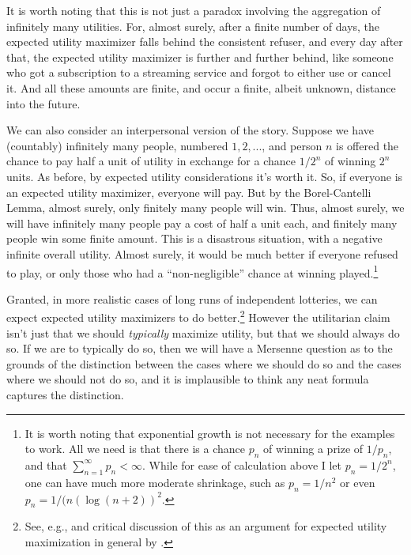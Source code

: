 It is worth noting that this is not just a paradox involving the aggregation of infinitely many utilities.
For, almost surely, after a finite number of days, the expected utility maximizer
falls behind the consistent refuser, and every day after that, the expected utility maximizer is further and further behind,
like someone who got a subscription to a streaming service and forgot to either use or cancel it. And all these amounts are 
finite, and occur a finite, albeit unknown, distance into the future.

We can also consider an interpersonal version of the story. Suppose we have (countably) infinitely many people, numbered $1,2,...$, and person $n$ 
is offered the chance to pay half a unit of utility in exchange for a chance $1/2^n$ of winning $2^n$ units. As before, by expected utility
considerations it's worth it. So, if everyone is an expected utility maximizer, everyone will pay. But by the Borel-Cantelli Lemma, 
almost surely, only finitely many people will win. Thus, almost surely, we will have infinitely many people
pay a cost of half a unit each, and finitely many people win some finite amount. This is a disastrous situation, with a negative infinite
overall utility. Almost surely, it would be much better if everyone refused to play, or only those who had a ``non-negligible'' chance 
at winning played.\footnote{It is worth noting that exponential growth is not necessary for the examples to work. All we need is that
there is a chance $p_n$ of winning a prize of $1/p_n$, and that $\sum_{n=1}^\infty p_n < \infty$. While for ease of calculation above
I let $p_n=1/2^n$, one can have much more moderate shrinkage, such as $p_n=1/n^2$ or even $p_n=1/(n(\log (n+2))^2$.}

Granted, in more realistic cases of long runs of independent lotteries, we can expect expected utility maximizers
to do better.\footnote{See, e.g.,  and critical discussion of this as an argument for
expected utility maximization in general by .} 
However the utilitarian claim isn't just that we should \textit{typically} maximize utility, but that we should 
always do so.  If we are to typically do so, then we will have a Mersenne question as to the grounds of the 
distinction between the cases where we should do so and the cases where we should not do so, and it is implausible
to think any neat formula captures the distinction.


